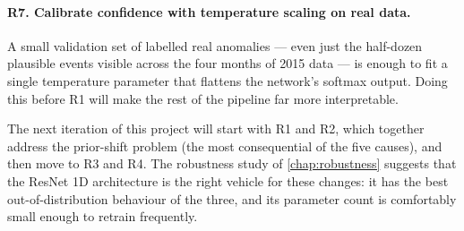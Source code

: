 \paragraph{R7. Calibrate confidence with temperature scaling on real
data.} A small validation set of labelled real anomalies --- even just
the half-dozen plausible events visible across the four months of 2015
data --- is enough to fit a single temperature parameter that flattens
the network's softmax output. Doing this before R1 will make the rest
of the pipeline far more interpretable.

\medskip
The next iteration of this project will start with R1 and R2, which
together address the prior-shift problem (the most consequential of
the five causes), and then move to R3 and R4. The robustness study
of \cref{chap:robustness} suggests that the ResNet 1D architecture is
the right vehicle for these changes: it has the best out-of-distribution
behaviour of the three, and its parameter count is comfortably small
enough to retrain frequently.
